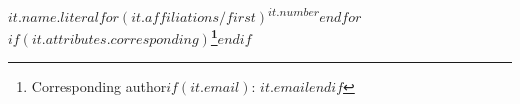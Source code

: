 \bfseries\sffamily\normalsize
$it.name.literal$$for(it.affiliations/first)$\textsuperscript{$it.number$}$endfor$$if(it.attributes.corresponding)$\thanks{Corresponding author$if(it.email)$: \href{mailto:$it.email$}{$it.email$}$endif$}$endif$